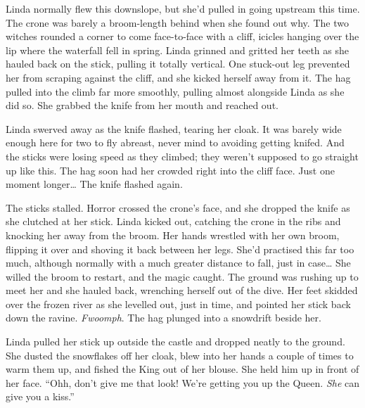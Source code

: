 Linda normally flew this downslope, but she'd pulled in going upstream this time.
The crone was barely a broom-length behind when she found out why.
The two witches rounded a corner to come face-to-face with a cliff, icicles hanging over the lip where the waterfall fell in spring.
Linda grinned and gritted her teeth as she hauled back on the stick, pulling it totally vertical.
One stuck-out leg prevented her from scraping against the cliff, and she kicked herself away from it.
The hag pulled into the climb far more smoothly, pulling almost alongside Linda as she did so.
She grabbed the knife from her mouth and reached out.

Linda swerved away as the knife flashed, tearing her cloak.
It was barely wide enough here for two to fly abreast, never mind to avoiding getting knifed.
And the sticks were losing speed as they climbed; they weren't supposed to go straight up like this.
The hag soon had her crowded right into the cliff face.
Just one moment longer{\dots}
The knife flashed again.

The sticks stalled.
Horror crossed the crone's face, and she dropped the knife as she clutched at her stick.
Linda kicked out, catching the crone in the ribs and knocking her away from the broom.
Her hands wrestled with her own broom, flipping it over and shoving it back between her legs.
She'd practised this far too much, although normally with a much greater distance to fall, just in case{\dots}
She willed the broom to restart, and the magic caught.
The ground was rushing up to meet her and she hauled back, wrenching herself out of the dive.
Her feet skidded over the frozen river as she levelled out, just in time, and pointed her stick back down the ravine.
\emph{Fwoomph}.
The hag plunged into a snowdrift beside her.

\storybreak

Linda pulled her stick up outside the castle and dropped neatly to the ground.
She dusted the snowflakes off her cloak, blew into her hands a couple of times to warm them up, and fished the King out of her blouse.
She held him up in front of her face.
``Ohh, don't give me that look!
We're getting you up the Queen.
\emph{She} can give you a kiss.''

